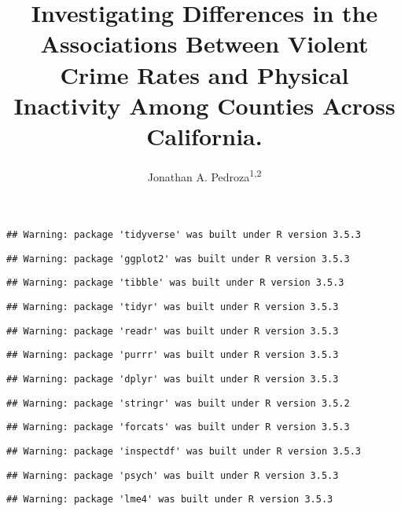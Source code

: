 \documentclass[man]{apa6}
\title{Investigating Differences in the Associations Between Violent Crime Rates and Physical Inactivity Among Counties Across California.}
\author{Jonathan A. Pedroza\textsuperscript{1,2}}
\date{}
\affiliation{
\vspace{0.5cm}
\textsuperscript{1} University of Oregon\\\textsuperscript{2} Prevention Science Institute}
\begin{document}
\maketitle

\begin{verbatim}
## Warning: package 'tidyverse' was built under R version 3.5.3
\end{verbatim}

\begin{verbatim}
## Warning: package 'ggplot2' was built under R version 3.5.3
\end{verbatim}

\begin{verbatim}
## Warning: package 'tibble' was built under R version 3.5.3
\end{verbatim}

\begin{verbatim}
## Warning: package 'tidyr' was built under R version 3.5.3
\end{verbatim}

\begin{verbatim}
## Warning: package 'readr' was built under R version 3.5.3
\end{verbatim}

\begin{verbatim}
## Warning: package 'purrr' was built under R version 3.5.3
\end{verbatim}

\begin{verbatim}
## Warning: package 'dplyr' was built under R version 3.5.3
\end{verbatim}

\begin{verbatim}
## Warning: package 'stringr' was built under R version 3.5.2
\end{verbatim}

\begin{verbatim}
## Warning: package 'forcats' was built under R version 3.5.3
\end{verbatim}

\begin{verbatim}
## Warning: package 'inspectdf' was built under R version 3.5.3
\end{verbatim}

\begin{verbatim}
## Warning: package 'psych' was built under R version 3.5.3
\end{verbatim}

\begin{verbatim}
## Warning: package 'lme4' was built under R version 3.5.3
\end{verbatim}
\end{document}
